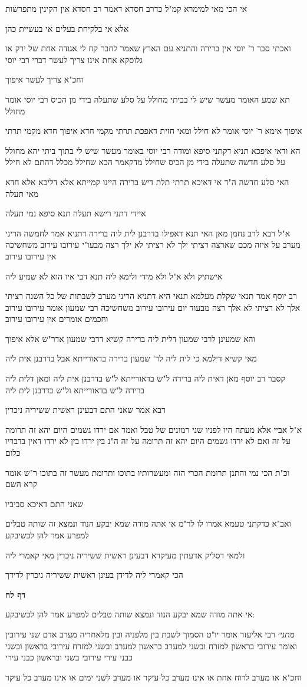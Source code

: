 \documentclass[12pt, openany]{book}
\newcommand{\sethebfont}{
\fontsize{10.5pt}{21.0pt} \selectfont
}
\newcommand{\textblock}[1]{
{\sethebfont #1\\}	
}
\newcommand{\sectname}{}
\newcommand{\newsection}[1]{
	\addcontentsline{toc}{section}{#1}
	\renewcommand{\sectname}{#1}	
	\vspace{-\baselineskip}
	\begin{center}
		\textbf{%
\fontsize{16pt}{16pt}\selectfont
			#1}
	\end{center}
	\vspace{-\baselineskip}
	\nopagebreak
}
\begin{document}
\textblock{אי הכי מאי למימרא קמ"ל כדרב חסדא דאמר רב חסדא אין הקינין מתפרשות}
\textblock{אלא אי בלקיחת בעלים אי בעשיית כהן}
\textblock{ואכתי סבר ר' יוסי אין ברירה והתניא עם הארץ שאמר לחבר קח לי אגודה אחת של ירק או גלוסקא אחת אינו צריך לעשר דברי רבי יוסי}
\textblock{וחכ"א צריך לעשר איפוך}
\textblock{תא שמע האומר מעשר שיש לי בביתי מחולל על סלע שתעלה בידי מן הכיס רבי יוסי אומר מחולל}
\textblock{איפוך אימא ר' יוסי אומר לא חילל ומאי חזית דאפכת תרתי מקמי חדא איפוך חדא מקמי תרתי}
\textblock{הא ודאי איפכא תניא דקתני סיפא ומודה רבי יוסי באומר מעשר שיש לי בתוך ביתי יהא מחולל על סלע חדשה שתעלה בידי מן הכיס שחילל מדקאמר הכא שחילל מכלל דהתם לא חילל}
\textblock{האי סלע חדשה ה"ד אי דאיכא תרתי תלת דיש ברירה היינו קמייתא אלא דליכא אלא חדא מאי תעלה}
\textblock{איידי דתני רישא תעלה תנא סיפא נמי תעלה}
\textblock{א"ל רבא לרב נחמן מאן האי תנא דאפילו בדרבנן לית ליה ברירה דתניא אמר לחמשה הריני מערב על איזה מכם שארצה רציתי ילך לא רציתי לא ילך רצה מבעו"י עירובו עירוב משחשיכה אין עירובו עירוב}
\textblock{אישתיק ולא א"ל ולא מידי ולימא ליה תנא דבי איו הוא לא שמיע ליה}
\textblock{רב יוסף אמר תנאי שקלת מעלמא תנאי היא דתניא הריני מערב לשבתות של כל השנה רציתי אלך לא רציתי לא אלך רצה מבעוד יום עירובו עירוב משחשיכה רבי שמעון אומר עירובו עירוב וחכמים אומרים אין עירובו עירוב}
\textblock{והא שמעינן לרבי שמעון דלית ליה ברירה קשיא דרבי שמעון אדר"ש אלא איפוך}
\textblock{מאי קשיא דילמא כי לית ליה לר' שמעון ברירה בדאורייתא אבל בדרבנן אית ליה}
\textblock{קסבר רב יוסף מאן דאית ליה ברירה ל"ש בדאורייתא ל"ש בדרבנן אית ליה ומאן דלית ליה ברירה ל"ש בדאורייתא ול"ש בדרבנן לית ליה}
\textblock{רבא אמר שאני התם דבעינן ראשית ששיריה ניכרין}
\textblock{א"ל אביי אלא מעתה היו לפניו שני רמונים של טבל ואמר אם ירדו גשמים היום יהא זה תרומה על זה ואם לא ירדו גשמים היום יהא זה תרומה על זה ה"נ בין ירדו בין לא ירדו דאין בדבריו כלום}
\textblock{וכ"ת הכי נמי והתנן תרומת הכרי הזה ומעשרותיו בתוכו ותרומת מעשר זה בתוכו ר"ש אומר קרא השם}
\textblock{שאני התם דאיכא סביביו}
\textblock{ואב"א כדקתני טעמא אמרו לו לר"מ אי אתה מודה שמא יבקע הנוד ונמצא זה שותה טבלים למפרע אמר להן לכשיבקע}
\textblock{ולמאי דסליק אדעתין מעיקרא דבעינן ראשית ששיריה ניכרין מאי קאמרי ליה}
\textblock{הכי קאמרי ליה לדידן בעינן ראשית ששיריה ניכרין לדידך}
\newsection{דף לח}
\textblock{אי אתה מודה שמא יבקע הנוד ונמצא שותה טבלים למפרע אמר להן לכשיבקע:}
\textblock{{\large\emph{מתני׳}} רבי אליעזר אומר יו"ט הסמוך לשבת בין מלפניה ובין מלאחריה מערב אדם שני עירובין ואומר עירובי בראשון למזרח ובשני למערב בראשון למערב ובשני למזרח עירובי בראשון ובשני כבני עירי עירובי בשני ובראשון כבני עירי}
\textblock{וחכ"א או מערב לרוח אחת או אינו מערב כל עיקר או מערב לשני ימים או אינו מערב כל עיקר}
\end{document}
